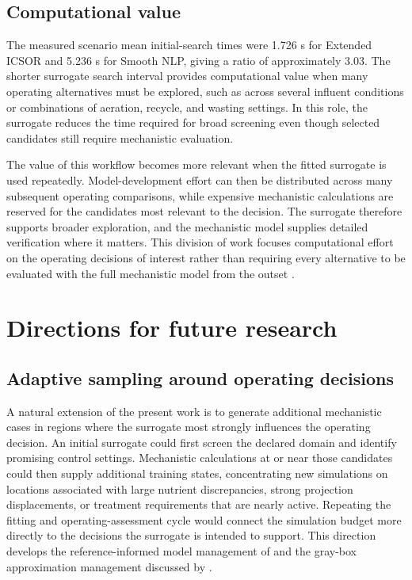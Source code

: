 \subsection{Computational value}

The measured scenario mean initial-search times were 1.726 s for Extended ICSOR and 5.236 s for Smooth NLP, giving a ratio of approximately 3.03. The shorter surrogate search interval provides computational value when many operating alternatives must be explored, such as across several influent conditions or combinations of aeration, recycle, and wasting settings. In this role, the surrogate reduces the time required for broad screening even though selected candidates still require mechanistic evaluation.

The value of this workflow becomes more relevant when the fitted surrogate is used repeatedly. Model-development effort can then be distributed across many subsequent operating comparisons, while expensive mechanistic calculations are reserved for the candidates most relevant to the decision. The surrogate therefore supports broader exploration, and the mechanistic model supplies detailed verification where it matters. This division of work focuses computational effort on the operating decisions of interest rather than requiring every alternative to be evaluated with the full mechanistic model from the outset \citep{BhosekarIerapetritou2018,Bliek2023}.

\section{Directions for future research}

\subsection{Adaptive sampling around operating decisions}

A natural extension of the present work is to generate additional mechanistic cases in regions where the surrogate most strongly influences the operating decision. An initial surrogate could first screen the declared domain and identify promising control settings. Mechanistic calculations at or near those candidates could then supply additional training states, concentrating new simulations on locations associated with large nutrient discrepancies, strong projection displacements, or treatment requirements that are nearly active. Repeating the fitting and operating-assessment cycle would connect the simulation budget more directly to the decisions the surrogate is intended to support. This direction develops the reference-informed model management of \citet{Alexandrov1998} and the gray-box approximation management discussed by \citet{Hameed2026}.


